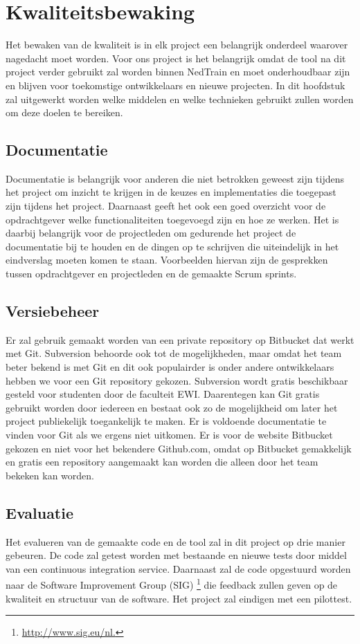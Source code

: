 \section{Kwaliteitsbewaking}
Het bewaken van de kwaliteit is in elk project een belangrijk onderdeel waarover nagedacht moet worden. Voor ons project is het belangrijk omdat de tool na dit project verder gebruikt zal worden binnen NedTrain en moet onderhoudbaar zijn en blijven voor toekomstige ontwikkelaars en nieuwe projecten. In dit hoofdstuk zal uitgewerkt worden welke middelen en welke technieken gebruikt zullen worden om deze doelen te bereiken.

\subsection{Documentatie}
Documentatie is belangrijk voor anderen die niet betrokken geweest zijn tijdens het project om inzicht te krijgen in de keuzes en implementaties die toegepast zijn tijdens het project. Daarnaast geeft het ook een goed overzicht voor de opdrachtgever welke functionaliteiten toegevoegd zijn en hoe ze werken. Het is daarbij belangrijk voor de projectleden om gedurende het project de documentatie bij te houden en de dingen op te schrijven die uiteindelijk in het eindverslag moeten komen te staan. Voorbeelden hiervan zijn de gesprekken tussen opdrachtgever en projectleden en de gemaakte Scrum sprints.

\subsection{Versiebeheer}
Er zal gebruik gemaakt worden van een private repository op Bitbucket dat werkt met Git. Subversion behoorde ook tot de mogelijkheden, maar omdat het team beter bekend is met Git en dit ook populairder is onder andere ontwikkelaars hebben we voor een Git repository gekozen. Subversion wordt gratis beschikbaar gesteld voor studenten door de faculteit EWI. Daarentegen kan Git gratis gebruikt worden door iedereen en bestaat ook zo de mogelijkheid om later het project publiekelijk toegankelijk te maken. Er is voldoende documentatie te vinden voor Git als we ergens niet uitkomen. Er is voor de website Bitbucket gekozen en niet voor het bekendere Github.com, omdat op Bitbucket gemakkelijk en gratis een repository aangemaakt kan worden die alleen door het team bekeken kan worden. 

\subsection{Evaluatie}
Het evalueren van de gemaakte code en de tool zal in dit project op drie manier gebeuren. De code zal getest worden met bestaande en nieuwe tests door middel van een continuous integration service. Daarnaast zal de code opgestuurd worden naar de Software Improvement Group (SIG) \footnote{\url{http://www.sig.eu/nl.}} die feedback zullen geven op de kwaliteit en structuur van de software. Het project zal eindigen met een pilottest.

